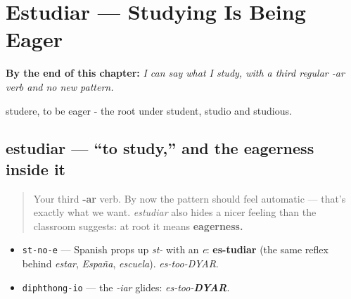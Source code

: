 
\chapter{Estudiar --- Studying Is Being Eager}
\label{ch:spanish-estudiar}

\begin{chapteropening}
\textbf{By the end of this chapter:} \emph{I can say what I study, with a third regular -ar verb and no new pattern.}

studere, to be eager - the root under student, studio and studious.
\end{chapteropening}

\section[estudiar]{estudiar — \textquotedblleft{}to study,\textquotedblright{} and the eagerness inside it}

\label{lesson:ES-C06-estudiar}



\begin{quote}
Your third \textbf{-ar} verb. By now the pattern should feel automatic — that's exactly what we want. \emph{estudiar} also hides a nicer feeling than the classroom suggests: at root it means \textbf{eagerness.}
\end{quote}

\begin{sounds}
\begin{itemize}
\raggedright
  \item \texttt{st-no-e} — Spanish props up \emph{st-} with an \emph{e}: \textbf{es-tudiar} (the same reflex behind \emph{estar}, \emph{España}, \emph{escuela}). \emph{es-too-DYAR}.
  \item \texttt{diphthong-io} — the \emph{-iar} glides: \emph{es-too-\textbf{DYAR}}.
\end{itemize}
\end{sounds}

